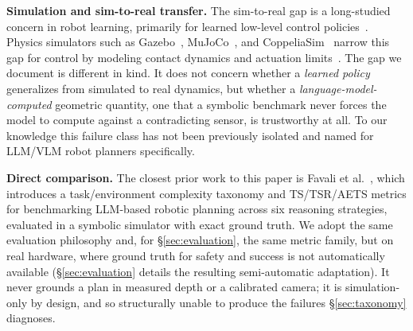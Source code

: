 \textbf{Simulation and sim-to-real transfer.} The sim-to-real gap is a
long-studied concern in robot learning, primarily for learned low-level
control policies~\cite{zhao2020simtoreal}. Physics simulators such as
Gazebo~\cite{koenig2004gazebo}, MuJoCo~\cite{todorov2012mujoco}, and
CoppeliaSim~\cite{rohmer2013coppeliasim} narrow this gap for control by
modeling contact dynamics and actuation limits~\cite{collins2021physics}.
The gap we document is different in kind. It does not concern whether a
\emph{learned policy} generalizes from simulated to real dynamics, but
whether a \emph{language-model-computed} geometric quantity, one that a
symbolic benchmark never forces the model to compute against a
contradicting sensor, is trustworthy at all. To our knowledge this
failure class has not been previously isolated and named for LLM/VLM robot
planners specifically.

\textbf{Direct comparison.} The closest prior work to this paper is
Favali et al.~\cite{favaliRAS}, which introduces a task/environment
complexity taxonomy and TS/TSR/AETS metrics for benchmarking LLM-based
robotic planning across six reasoning strategies, evaluated in a
symbolic simulator with exact ground truth. We adopt the same evaluation
philosophy and, for \S\ref{sec:evaluation}, the same metric family, but
on real hardware, where ground truth for safety and success is not
automatically available (\S\ref{sec:evaluation} details the resulting
semi-automatic adaptation). It never grounds a plan in measured depth or
a calibrated camera; it is simulation-only by design, and so
structurally unable to produce the failures \S\ref{sec:taxonomy}
diagnoses.
